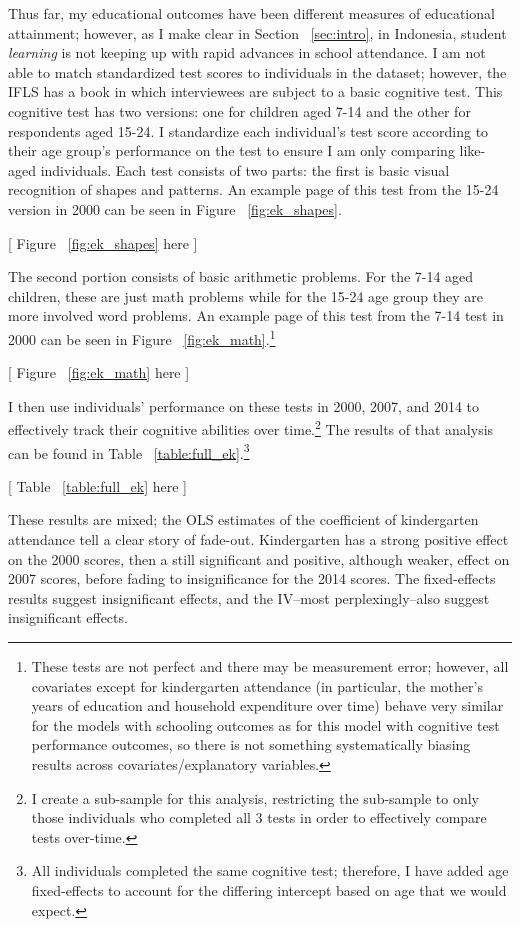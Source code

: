 Thus far, my educational outcomes have been different measures of educational attainment; however, as I make clear in Section ~\ref{sec:intro}, in Indonesia, student \textit{learning} is not keeping up with rapid advances in school attendance. I am not able to match standardized test scores to individuals in the dataset; however, the IFLS has a book in which interviewees are subject to a basic cognitive test. This cognitive test has two versions: one for children aged 7-14 and the other for respondents aged 15-24. I standardize each individual's test score according to their age group's performance on the test to ensure I am only comparing like-aged individuals. Each test consists of two parts: the first is basic visual recognition of shapes and patterns. An example page of this test from the 15-24 version in 2000 can be seen in Figure ~\ref{fig:ek_shapes}.
\begin{center}
	[ Figure ~\ref{fig:ek_shapes} here ]
\end{center}
The second portion consists of basic arithmetic problems. For the 7-14 aged children, these are just math problems while for the 15-24 age group they are more involved word problems. An example page of this test from the 7-14 test in 2000 can be seen in Figure ~\ref{fig:ek_math}.\footnote{These tests are not perfect and there may be measurement error; however, all covariates except for kindergarten attendance (in particular, the mother's years of education and household expenditure over time) behave very similar for the models with schooling outcomes as for this model with cognitive test performance outcomes, so there is not something systematically biasing results across covariates/explanatory variables.}
\begin{center}
	[ Figure ~\ref{fig:ek_math} here ]
\end{center}
I then use individuals' performance on these tests in 2000, 2007, and 2014 to effectively track their cognitive abilities over time.\footnote{I create a sub-sample for this analysis, restricting the sub-sample to only those individuals who completed all 3 tests in order to effectively compare tests over-time.} The results of that analysis can be found in Table ~\ref{table:full_ek}.\footnote{All individuals completed the same cognitive test; therefore, I have added age fixed-effects to account for the differing intercept based on age that we would expect.}
\begin{center}
	[ Table ~\ref{table:full_ek} here ]
\end{center}
These results are mixed; the OLS estimates of the coefficient of kindergarten attendance tell a clear story of fade-out. Kindergarten has a strong positive effect on the 2000 scores, then a still significant and positive, although weaker, effect on 2007 scores, before fading to insignificance for the 2014 scores. The fixed-effects results suggest insignificant effects, and the IV--most perplexingly--also suggest insignificant effects. 


